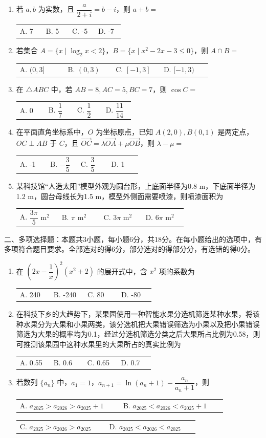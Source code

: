 \documentclass[12pt,a4paper]{article}
\makeatletter
\newcommand{\hei}{\CJKfamily{hei}}
\newcommand{\choices}[4]{%
	\par\noindent
	\begin{tabular}{@{}p{0.22\linewidth}p{0.22\linewidth}p{0.22\linewidth}p{0.22\linewidth}@{}}
		A. #1 & B. #2 & C. #3 & D. #4
	\end{tabular}%
	\par
}
\newcommand{\Choices}[4]{%
	\par\noindent
	\begin{tabular}{@{}p{0.44\linewidth}p{0.44\linewidth}@{}}
		A. #1 & B. #2
	\end{tabular}%
	\par
	\par\noindent
	\begin{tabular}{@{}p{0.44\linewidth}p{0.44\linewidth}@{}}
		C. #3 & D. #4
	\end{tabular}%
	\par
}
\makeatother
\begin{document}
	\begin{enumerate}
		\item 若 \( a, b \) 为实数，且 \( \dfrac{a}{2+i} = b-i \)，则 \( a+b= \)
		\choices{7}{5}{-5}{-7}

		\item 若集合 \( A = \{x \mid \log_2 x < 2\} \)，\( B = \{x \mid x^2 - 2x - 3 \leq 0\} \)，则 \( A \cap B = \)
		\choices{\((0, 3]\)}{\((0, 3)\)}{\([-1, 3]\)}{\([-1, 3)\)}

		\item 在 \( \triangle ABC \) 中，若 \( AB = 8, AC = 5, BC = 7 \)，则 \( \cos C = \)
		\choices{0}{\(\dfrac{1}{7}\)}{\(\dfrac{1}{2}\)}{\(\dfrac{11}{14}\)}

		\item 在平面直角坐标系中，\( O \) 为坐标原点，已知 \( A(2, 0), B(0, 1) \) 是两定点，\( OC \perp AB \) 于 \( C \)，且 \( \overrightarrow{OC} = \lambda \overrightarrow{OA} + \mu \overrightarrow{OB} \)，则 \( \lambda - \mu = \)
		\choices{-1}{\(-\dfrac{3}{5}\)}{\(\dfrac{3}{5}\)}{1}

		\item 某科技馆“人造太阳”模型外观为圆台形，上底面半径为0.8 m，下底面半径为1.2 m，圆台母线长为1.5 m，模型外侧面需要喷漆，则喷漆面积为
		\choices{\(\dfrac{3\pi}{5}\text{ m}^2\)}{\(\pi\text{ m}^2\)}{\(3\pi\text{ m}^2\)}{\(6\pi\text{ m}^2\)}
	\end{enumerate}

	\newpage



	{\hei\noindent 二、多项选择题：本题共3小题，每小题6分，共18分。在每小题给出的选项中，有多项符合题目要求。全部选对的得6分，部分选对的得部分分，有选错的得0分。}

	\vspace{0.3cm}

	\begin{enumerate}[resume]	%


		\item 在 \( (2x - \dfrac{1}{x})^2 (x^2 + 2) \) 的展开式中，含 \( x^2 \) 项的系数为
		\choices{240}{-240}{80}{-80}

		\item 在科技下乡的大趋势下，某果园使用一种智能水果分选机筛选某种水果，将该种水果分为大果和小果两类，该分选机把大果错误筛选为小果以及把小果错误筛选为大果的概率均为0.1，经过分选机筛选分类之后大果所占比例为0.58，则可推测该果园中这种水果里的大果所占的真实比例为
		\choices{0.55}{0.6}{0.65}{0.7}

		\item 若数列 \( \{a_n\} \) 中，\( a_1 = 1 \)，\( a_{n+1} = \ln(a_n + 1) - \dfrac{a_n}{a_n + 1} \)，则
		\Choices{\(a_{2025} > a_{2026} > a_{2025} + 1\)}{\(a_{2025} < a_{2026} < a_{2025} + 1\)}{\(a_{2025} > a_{2026} > a_{2025}\)}{\(a_{2025} < a_{2026} < a_{2025}\)}
	\end{enumerate}
\end{document}
